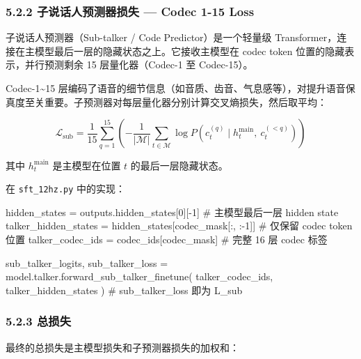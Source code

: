 \documentclass[
  english,
  letterpaper,
  DIV=11,
  numbers=noendperiod]{scrartcl}
\newenvironment{Shaded}{\begin{snugshade}}{\end{snugshade}}
\newcommand{\CommentTok}[1]{\textcolor[rgb]{0.37,0.37,0.37}{#1}}
\newcommand{\DecValTok}[1]{\textcolor[rgb]{0.68,0.00,0.00}{#1}}
\newcommand{\NormalTok}[1]{\textcolor[rgb]{0.00,0.23,0.31}{#1}}
\newcommand{\OperatorTok}[1]{\textcolor[rgb]{0.37,0.37,0.37}{#1}}
\begin{document}
\subsubsection{5.2.2 子说话人预测器损失 --- Codec 1-15
Loss}\label{ux5b50ux8bf4ux8bddux4ebaux9884ux6d4bux5668ux635fux5931-codec-1-15-loss}

子说话人预测器（Sub-talker / Code Predictor）是一个轻量级
Transformer，连接在主模型最后一层的隐藏状态之上。它接收主模型在 codec
token 位置的隐藏表示，并行预测剩余 15 层量化器（Codec-1 至 Codec-15）。

Codec-1\textasciitilde15
层编码了语音的细节信息（如音质、齿音、气息感等），对提升语音保真度至关重要。子预测器对每层量化器分别计算交叉熵损失，然后取平均：

\[\mathcal{L}_{\text{sub}} = \frac{1}{15} \sum_{q=1}^{15} \left( -\frac{1}{|\mathcal{M}|} \sum_{t \in \mathcal{M}} \log P(c_t^{(q)} \mid h_t^{\text{main}}, \ c_t^{(<q)}) \right)\]

其中 \(h_t^{\text{main}}\) 是主模型在位置 \(t\) 的最后一层隐藏状态。

在 \texttt{sft\_12hz.py} 中的实现：

\begin{Shaded}
\begin{Highlighting}[]
\NormalTok{hidden\_states }\OperatorTok{=}\NormalTok{ outputs.hidden\_states[}\DecValTok{0}\NormalTok{][}\OperatorTok{{-}}\DecValTok{1}\NormalTok{]          }\CommentTok{\# 主模型最后一层 hidden state}
\NormalTok{talker\_hidden\_states }\OperatorTok{=}\NormalTok{ hidden\_states[codec\_mask[:, :}\OperatorTok{{-}}\DecValTok{1}\NormalTok{]]  }\CommentTok{\# 仅保留 codec token 位置}
\NormalTok{talker\_codec\_ids }\OperatorTok{=}\NormalTok{ codec\_ids[codec\_mask]               }\CommentTok{\# 完整 16 层 codec 标签}

\NormalTok{sub\_talker\_logits, sub\_talker\_loss }\OperatorTok{=}\NormalTok{ model.talker.forward\_sub\_talker\_finetune(}
\NormalTok{    talker\_codec\_ids, talker\_hidden\_states}
\NormalTok{)}
\CommentTok{\# sub\_talker\_loss 即为 L\_sub}
\end{Highlighting}
\end{Shaded}

\subsubsection{5.2.3 总损失}\label{ux603bux635fux5931}

最终的总损失是主模型损失和子预测器损失的加权和：
\end{document}
